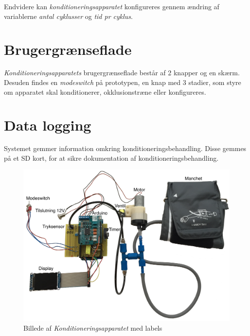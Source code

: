 Endvidere kan \textit{konditioneringsapparatet} konfigureres gennem ændring af variablerne \textit{antal cyklusser} og \textit{tid pr cyklus}.


\section{Brugergrænseflade}
\textit{Konditioneringsapparatets} brugergrænseflade består af 2 knapper og en skærm. Desuden findes en \textit{modeswitch} på prototypen, en knap med 3 stadier, som styre om apparatet skal konditionerer, okklusionstræne eller konfigureres.  

\section{Data logging}
Systemet gemmer information omkring konditioneringsbehandling. Disse gemmes på et SD kort, for at sikre dokumentation af konditioneringsbehandling.

\begin{figure}[H]
	\centering
	\includegraphics[width = \textwidth]{billeder/Konditioneringsapparat-tekst.png}
	\caption{Billede af \textit{Konditioneringsapparatet} med labels} \label{fig:oversigtsbillede}
\end{figure}